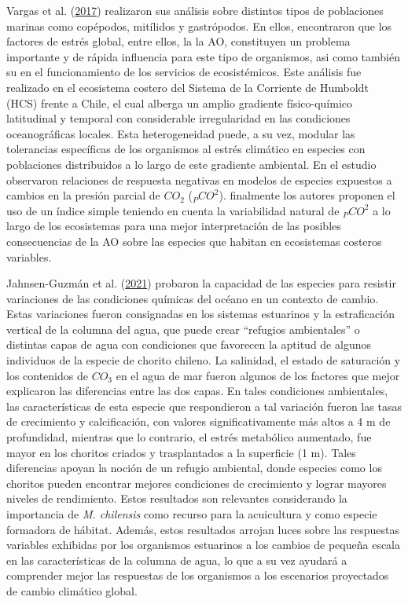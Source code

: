 \documentclass[
]{article}
\begin{document}
Vargas et al. (\protect\hyperlink{ref-Vargas2017}{2017}) realizaron sus
análisis sobre distintos tipos de poblaciones marinas como copépodos,
mitílidos y gastrópodos. En ellos, encontraron que los factores de
estrés global, entre ellos, la la AO, constituyen un problema importante
y de rápida influencia para este tipo de organismos, asi como también su
en el funcionamiento de los servicios de ecosistémicos. Este análisis
fue realizado en el ecosistema costero del Sistema de la Corriente de
Humboldt (HCS) frente a Chile, el cual alberga un amplio gradiente
físico-químico latitudinal y temporal con considerable irregularidad en
las condiciones oceanográficas locales. Esta heterogeneidad puede, a su
vez, modular las tolerancias específicas de los organismos al estrés
climático en especies con poblaciones distribuidos a lo largo de este
gradiente ambiental. En el estudio observaron relaciones de respuesta
negativas en modelos de especies expuestos a cambios en la presión
parcial de \({CO}_{2}\) (\(_PCO^2\)). finalmente los autores proponen el
uso de un índice simple teniendo en cuenta la variabilidad natural de
\(_PCO^2\) a lo largo de los ecosistemas para una mejor interpretación
de las posibles consecuencias de la AO sobre las especies que habitan en
ecosistemas costeros variables.

Jahnsen-Guzmán et al. (\protect\hyperlink{ref-Jahnsen-Guzman2021}{2021})
probaron la capacidad de las especies para resistir variaciones de las
condiciones químicas del océano en un contexto de cambio. Estas
variaciones fueron consignadas en los sistemas estuarinos y la
estraficación vertical de la columna del agua, que puede crear
``refugios ambientales'' o distintas capas de agua con condiciones que
favorecen la aptitud de algunos individuos de la especie de chorito
chileno. La salinidad, el estado de saturación y los contenidos de
\({CO}_{3}\) en el agua de mar fueron algunos de los factores que mejor
explicaron las diferencias entre las dos capas. En tales condiciones
ambientales, las características de esta especie que respondieron a tal
variación fueron las tasas de crecimiento y calcificación, con valores
significativamente más altos a 4 m de profundidad, mientras que lo
contrario, el estrés metabólico aumentado, fue mayor en los choritos
criados y trasplantados a la superficie (1 m). Tales diferencias apoyan
la noción de un refugio ambiental, donde especies como los choritos
pueden encontrar mejores condiciones de crecimiento y lograr mayores
niveles de rendimiento. Estos resultados son relevantes considerando la
importancia de \emph{M. chilensis} como recurso para la acuicultura y
como especie formadora de hábitat. Además, estos resultados arrojan
luces sobre las respuestas variables exhibidas por los organismos
estuarinos a los cambios de pequeña escala en las características de la
columna de agua, lo que a su vez ayudará a comprender mejor las
respuestas de los organismos a los escenarios proyectados de cambio
climático global.
\end{document}
